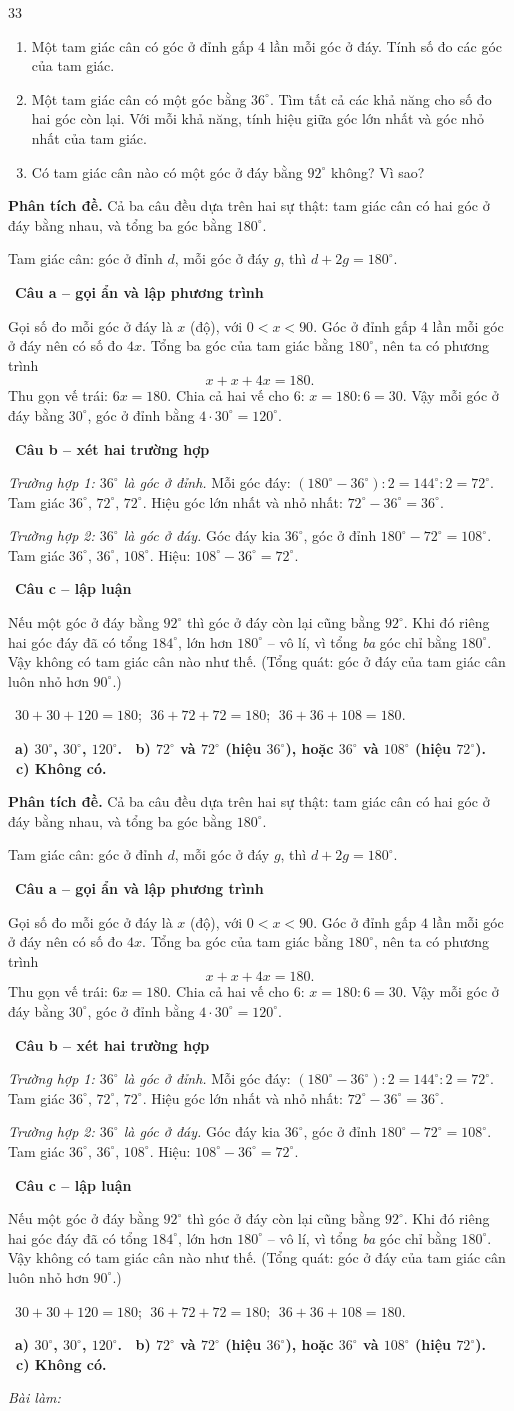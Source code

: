 \documentclass[11pt]{article}
\newif\ifsol \soltrue
\providecommand{\AnsWord}{Đáp số}
\newenvironment{probbox}[2]{\begin{probboxT}{#1}{#2}}{\end{probboxT}}
\newcommand{\StuProb}[2]{\begin{probboxS}{#1}{#2}\StuProbBody\end{probboxS}}
\newcommand{\ans}[1]{\par\smallskip{\bfseries\color{tmGreen!88!black}\AnsWord:}\ {\bfseries\color{AnsRed}#1}\par}
\newcommand{\probsol}[1]{%
  \begin{lrbox}{\solmeasure}\begin{minipage}{\dimexpr\linewidth-24pt\relax}#1\end{minipage}\end{lrbox}%
  \ifsol
    \begin{solbox}#1\end{solbox}%
  \else
    \setlength{\solht}{\dimexpr\ht\solmeasure+\dp\solmeasure+0.85cm\relax}%
    \ifdim\solht<1.35cm\setlength{\solht}{1.35cm}\fi
    \ifdim\solht>\StudentMaxWork\setlength{\solht}{\StudentMaxWork}\fi
    \par\noindent\begin{minipage}{\linewidth}%
    \expandafter\StuProb\StuProbArgs
    \begin{tcolorbox}[colback=white,colframe=Line,boxrule=0.8pt,arc=5pt,
      left=8pt,right=8pt,top=4pt,bottom=4pt,height=\solht]{\footnotesize\color{Slate}\itshape\WorkWord}\end{tcolorbox}%
    \end{minipage}\par\medskip
  \fi}
\newlength{\StudentMaxWork}\setlength{\StudentMaxWork}{4.5cm}
\newcommand{\step}[2]{\par\smallskip\noindent{\bfseries\color{tmBlue!85!black}\StepWord~#1.}\ {\bfseries #2}\par\nopagebreak}
\newcommand{\verify}[1]{\par\smallskip\noindent{\bfseries\color{tmGreen!80!black}\faCheckCircle\ \CheckWord}\ #1\par}
\def\WorkWord{Bài làm:}
\def\AnsWord{Đáp số}
\def\StepWord{Bước}
\def\CheckWord{Thử lại:}
\begin{document}
\begin{probbox}{33}{\relax}
\begin{enumerate}[label=\alph*),leftmargin=1.6em,itemsep=0pt,topsep=0pt]
  \item Một tam giác cân có góc ở đỉnh gấp $4$ lần mỗi góc ở đáy. Tính số đo các góc của tam giác.
  \item Một tam giác cân có một góc bằng $36^\circ$. Tìm tất cả các khả năng cho số đo hai góc còn lại. Với mỗi khả năng, tính hiệu giữa góc lớn nhất và góc nhỏ nhất của tam giác.
  \item Có tam giác cân nào có một góc ở đáy bằng $92^\circ$ không? Vì sao?
\end{enumerate}
\end{probbox}
\probsol{
\textbf{Phân tích đề.} Cả ba câu đều dựa trên hai sự thật: tam giác cân có hai góc ở đáy bằng nhau, và tổng ba góc bằng $180^\circ$.
\begin{recallbox}Tam giác cân: góc ở đỉnh $d$, mỗi góc ở đáy $g$, thì $d+2g=180^\circ$.\end{recallbox}
\step{1}{Câu a -- gọi ẩn và lập phương trình}
Gọi số đo mỗi góc ở đáy là $x$ (độ), với $0<x<90$. Góc ở đỉnh gấp $4$ lần mỗi góc ở đáy nên có số đo $4x$.
Tổng ba góc của tam giác bằng $180^\circ$, nên ta có phương trình
\[ x+x+4x=180. \]
Thu gọn vế trái: $6x=180$. Chia cả hai vế cho $6$: $x=180:6=30$.
Vậy mỗi góc ở đáy bằng $30^\circ$, góc ở đỉnh bằng $4\cdot30^\circ=120^\circ$.

\step{2}{Câu b -- xét hai trường hợp}
\emph{Trường hợp 1: $36^\circ$ là góc ở đỉnh.} Mỗi góc đáy: $(180^\circ-36^\circ):2=144^\circ:2=72^\circ$. Tam giác $36^\circ,\,72^\circ,\,72^\circ$. Hiệu góc lớn nhất và nhỏ nhất: $72^\circ-36^\circ=36^\circ$.

\emph{Trường hợp 2: $36^\circ$ là góc ở đáy.} Góc đáy kia $36^\circ$, góc ở đỉnh $180^\circ-72^\circ=108^\circ$. Tam giác $36^\circ,\,36^\circ,\,108^\circ$. Hiệu: $108^\circ-36^\circ=72^\circ$.

\step{3}{Câu c -- lập luận}
\begin{proofbox}Nếu một góc ở đáy bằng $92^\circ$ thì góc ở đáy còn lại cũng bằng $92^\circ$. Khi đó riêng hai góc đáy đã có tổng $184^\circ$, lớn hơn $180^\circ$ -- vô lí, vì tổng \emph{ba} góc chỉ bằng $180^\circ$. Vậy không có tam giác cân nào như thế. (Tổng quát: góc ở đáy của tam giác cân luôn nhỏ hơn $90^\circ$.)\end{proofbox}
\verify{$30+30+120=180$; $\;36+72+72=180$; $\;36+36+108=180$.}
\ans{a) $30^\circ$, $30^\circ$, $120^\circ$. \ b) $72^\circ$ và $72^\circ$ (hiệu $36^\circ$), hoặc $36^\circ$ và $108^\circ$ (hiệu $72^\circ$). \ c) Không có.}
}
\end{document}

